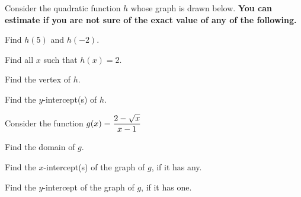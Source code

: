 \documentclass[11pt]{exam}
\begin{document}
\begin{questions}
\question[4] Consider the quadratic function $h$ whose graph is drawn below.  \textbf{You can estimate if you are not sure of the exact value of any of the following.}
\begin{multicols}{2}
\begin{center}
\end{center}
\begin{compactenum}[(a)]
\item Find $h(5)$ and $h(-2)$.
\vspace{1.5cm}

\item Find all $x$ such that $h(x)=2$.
\vspace{1.5cm}

\item Find the vertex of $h$.
\vspace{1.5cm}

\item Find the $y$-intercept(s) of $h$.
\vspace{1.5cm}
\end{compactenum}
\end{multicols}

\question[3] Consider the function $\displaystyle{g(x)=\frac{2-\sqrt{x}}{x-1}}$

\begin{compactenum}[(a)]
\item Find the domain of $g$.
\vspace{4cm}

\item Find the $x$-intercept(s) of the graph of $g$, if it has any.
\vspace{4cm}

\item Find the $y$-intercept of the graph of $g$, if it has one.

\end{compactenum}
\newpage


\end{questions}
\end{document}
